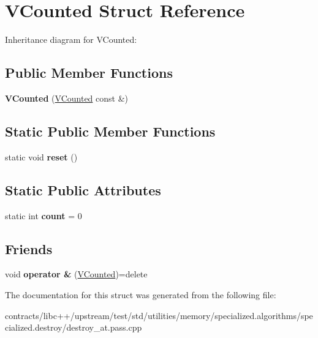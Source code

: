 \hypertarget{struct_v_counted}{}\section{V\+Counted Struct Reference}
\label{struct_v_counted}


Inheritance diagram for V\+Counted\+:
\subsection*{Public Member Functions}
\begin{DoxyCompactItemize}
\item 
\mbox{\label{struct_v_counted_aa83eaddb571c9fcd9924297372e6d44a}} 
{\bfseries V\+Counted} (\mbox{\hyperlink{struct_v_counted}{V\+Counted}} const \&)
\end{DoxyCompactItemize}
\subsection*{Static Public Member Functions}
\begin{DoxyCompactItemize}
\item 
\mbox{\label{struct_v_counted_aeb356bc539619b0bfc5b978537ced5c2}} 
static void {\bfseries reset} ()
\end{DoxyCompactItemize}
\subsection*{Static Public Attributes}
\begin{DoxyCompactItemize}
\item 
\mbox{\label{struct_v_counted_aa864760dccdffcfd13fbc26a92c70e32}} 
static int {\bfseries count} = 0
\end{DoxyCompactItemize}
\subsection*{Friends}
\begin{DoxyCompactItemize}
\item 
\mbox{\label{struct_v_counted_a31d262412905108a0b95cb4061437239}} 
void {\bfseries operator \&} (\mbox{\hyperlink{struct_v_counted}{V\+Counted}})=delete
\end{DoxyCompactItemize}


The documentation for this struct was generated from the following file\+:\begin{DoxyCompactItemize}
\item 
contracts/libc++/upstream/test/std/utilities/memory/specialized.\+algorithms/specialized.\+destroy/destroy\+\_\+at.\+pass.\+cpp\end{DoxyCompactItemize}
